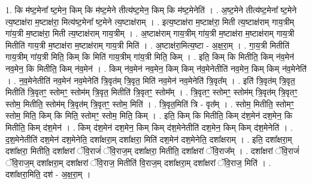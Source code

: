 \documentclass[17pt]{extarticle}
\begin{document}
1. कि म॑ष्ट॒मेना᳚ ष्ट॒मेन॒ किम् कि म॑ष्ट॒मेने तीत्य॑ष्ट॒मेन॒ किम् कि म॑ष्ट॒मेनेति॑ । . अ॒ष्ट॒मेने तीत्य॑ष्ट॒मेना᳚ ष्ट॒मेने त्य॒ष्टाक्ष॑रा म॒ष्टाक्ष॑रा॒ मित्य॑ष्ट॒मेना᳚ ष्ट॒मेने त्य॒ष्टाक्ष॑राम् । . इत्य॒ष्टाक्ष॑रा म॒ष्टाक्ष॑रा॒ मिती त्य॒ष्टाक्ष॑राम् गाय॒त्रीम् गा॑य॒त्री म॒ष्टाक्ष॑रा॒ मिती त्य॒ष्टाक्ष॑राम् गाय॒त्रीम् । . अ॒ष्टाक्ष॑राम् गाय॒त्रीम् गा॑य॒त्री म॒ष्टाक्ष॑रा म॒ष्टाक्ष॑राम् गाय॒त्री मितीति॑ गाय॒त्री म॒ष्टाक्ष॑रा म॒ष्टाक्ष॑राम् गाय॒त्री मिति॑ । . अ॒ष्टाक्ष॑रा॒मित्य॒ष्टा - अ॒क्ष॒रा॒म् । . गा॒य॒त्री मितीति॑ गाय॒त्रीम् गा॑य॒त्री मिति॒ किम् कि मिति॑ गाय॒त्रीम् गा॑य॒त्री मिति॒ किम् । . इति॒ किम् कि मितीति॒ किम् न॑व॒मेन॑ नव॒मेन॒ कि मितीति॒ किम् न॑व॒मेन॑ । . किम् न॑व॒मेन॑ नव॒मेन॒ किम् किम् न॑व॒मेनेतीति॑ नव॒मेन॒ किम् किम् न॑व॒मेनेति॑ । . न॒व॒मेनेतीति॑ नव॒मेन॑ नव॒मेनेति॑ त्रि॒वृत॑म् त्रि॒वृत॒ मिति॑ नव॒मेन॑ नव॒मेनेति॑ त्रि॒वृत᳚म् । . इति॑ त्रि॒वृत॑म् त्रि॒वृत॒ मितीति॑ त्रि॒वृतꣳ॒॒ स्तोमꣳ॒॒ स्तोम॑म् त्रि॒वृत॒ मितीति॑ त्रि॒वृतꣳ॒॒ स्तोम᳚म् । . त्रि॒वृतꣳ॒॒ स्तोमꣳ॒॒ स्तोम॑म् त्रि॒वृत॑म् त्रि॒वृतꣳ॒॒ स्तोम॒ मितीति॒ स्तोम॑म् त्रि॒वृत॑म् त्रि॒वृतꣳ॒॒ स्तोम॒ मिति॑ । . त्रि॒वृत॒मिति॑ त्रि - वृत᳚म् । . स्तोम॒ मितीति॒ स्तोमꣳ॒॒ स्तोम॒ मिति॒ किम् कि मिति॒ स्तोमꣳ॒॒ स्तोम॒ मिति॒ किम् । . इति॒ किम् कि मितीति॒ किम् द॑श॒मेन॑ दश॒मेन॒ कि मितीति॒ किम् द॑श॒मेन॑ । . किम् द॑श॒मेन॑ दश॒मेन॒ किम् किम् द॑श॒मेनेतीति॑ दश॒मेन॒ किम् किम् द॑श॒मेनेति॑ । . द॒श॒मेनेतीति॑ दश॒मेन॑ दश॒मेनेति॒ दशा᳚क्षरा॒म् दशा᳚क्षरा॒ मिति॑ दश॒मेन॑ दश॒मेनेति॒ दशा᳚क्षराम् । . इति॒ दशा᳚क्षरा॒म् दशा᳚क्षरा॒ मितीति॒ दशा᳚क्षरां ॅवि॒राजं॑ ॅवि॒राज॒म् दशा᳚क्षरा॒ मितीति॒ दशा᳚क्षरां ॅवि॒राज᳚म् । . दशा᳚क्षरां ॅवि॒राजं॑ ॅवि॒राज॒म् दशा᳚क्षरा॒म् दशा᳚क्षरां ॅवि॒राज॒ मितीति॑ वि॒राज॒म् दशा᳚क्षरा॒म् दशा᳚क्षरां ॅवि॒राज॒ मिति॑ । . दशा᳚क्षरा॒मिति॒ दश॑ - अ॒क्ष॒रा॒म् । \newline
\end{document}
